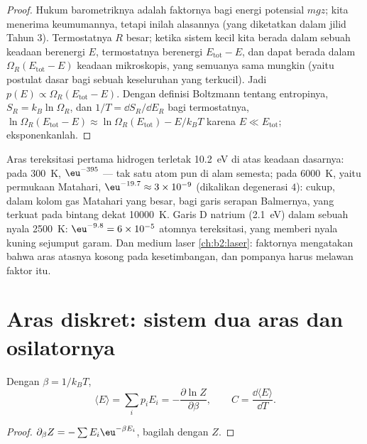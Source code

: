 \begin{proof}
Hukum barometriknya adalah faktornya bagi energi potensial $mgz$; kita
menerima keumumannya, tetapi inilah alasannya (yang diketatkan dalam
jilid Tahun 3). Termostatnya $R$ besar; ketika sistem kecil kita berada dalam
sebuah keadaan berenergi $E$, termostatnya berenergi $E_{\text{tot}} -
E$, dan dapat berada dalam $\Omega_R(E_{\text{tot}} - E)$ keadaan mikroskopis, yang semuanya
sama mungkin (yaitu postulat dasar bagi sebuah keseluruhan yang terkucil). Jadi
$p(E) \propto \Omega_R(E_{\text{tot}} - E)$. Dengan definisi Boltzmann
tentang entropinya, $S_R = k_B\ln\Omega_R$, dan $1/T = \dd S_R/\dd E_R$ bagi
termostatnya, $\ln\Omega_R(E_{\text{tot}} - E) \approx \ln\Omega_R(E_{\text{tot}})
- E/k_BT$ karena $E \ll E_{\text{tot}}$; eksponenkanlah.
\end{proof}

\begin{example}\label{ex:b2:boltzmann-factor:levels}
Aras tereksitasi pertama hidrogen terletak \qty{10.2}{eV} di atas keadaan
dasarnya: pada \qty{300}{K}, $\eu^{-395}$ --- tak satu atom pun di alam semesta; pada
\qty{6000}{K}, yaitu permukaan Matahari, $\eu^{-19.7} \approx 3 \times 10^{-9}$ (dikalikan
degenerasi $4$): cukup, dalam kolom gas Matahari yang besar, bagi
garis serapan Balmernya, yang terkuat pada bintang dekat \qty{10000}{K}.
Garis D natrium (\qty{2.1}{eV}) dalam sebuah nyala \qty{2500}{K}: $\eu^{-9.8} = 6
\times 10^{-5}$ atomnya tereksitasi, yang memberi nyala kuning sejumput
garam. Dan medium laser \cref{ch:b2:laser}: faktornya
mengatakan bahwa aras atasnya kosong pada kesetimbangan, dan pompanya harus melawan
faktor itu.
\end{example}

\section{Aras diskret: sistem dua aras dan osilatornya}

\begin{proposition}\label{prop:b2:boltzmann-factor:meanE}
Dengan $\beta = 1/k_BT$,
\[
\langle E\rangle = \sum_ip_iE_i = -\frac{\partial\ln Z}{\partial\beta}, \qquad
C = \frac{\dd\langle E\rangle}{\dd T} .
\]
\end{proposition}

\begin{proof}
$\partial_\beta Z = -\sum E_i\eu^{-\beta E_i}$, bagilah dengan $Z$.
\end{proof}

